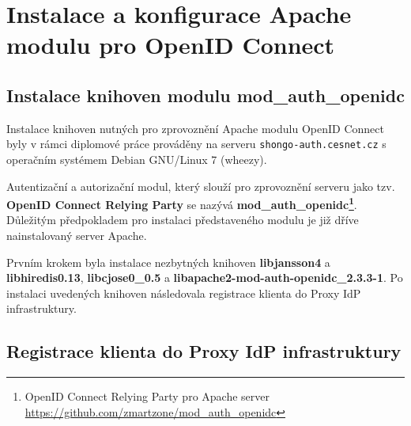 \documentclass[
  printed, %
  twoside, %
  table,   %
  nolof,     %
  nolot,     %
]{fithesis3}
\begin{document}
\section{Instalace a konfigurace Apache modulu pro OpenID Connect}
\label{apacheConfig}
\subsection{Instalace knihoven modulu mod\_auth\_openidc}
Instalace knihoven nutných pro zprovoznění Apache modulu OpenID Connect byly v rámci diplomové práce prováděny na serveru \texttt{shongo-auth.cesnet.cz} s operačním systémem Debian GNU/Linux 7 (wheezy). 
\par 
Autentizační a autorizační modul, který slouží pro zprovoznění serveru jako tzv. \textbf{OpenID Connect Relying Party} se nazývá \textbf{mod\_auth\_openidc\footnote{OpenID Connect Relying Party pro Apache server \url{https://github.com/zmartzone/mod\_auth\_openidc}}}. Důležitým předpokladem pro instalaci představeného modulu je již dříve nainstalovaný server Apache. 
\par 
Prvním krokem byla instalace nezbytných knihoven \textbf{libjansson4} a \textbf{libhiredis0.13}, \textbf{libcjose0\_0.5} a \textbf{libapache2-mod-auth-openidc\_2.3.3-1}. Po instalaci uvedených knihoven následovala registrace klienta do Proxy IdP infrastruktury. 

\subsection{Registrace klienta do Proxy IdP infrastruktury}
\end{document}
